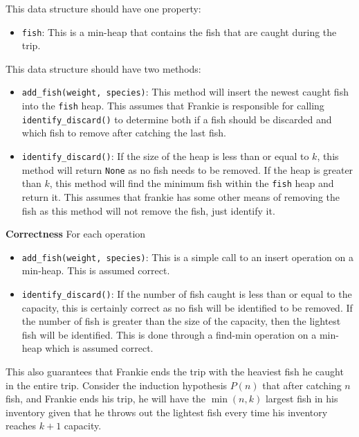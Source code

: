 \documentclass[12pt,twoside]{article}
\begin{document}
\begin{problems}
\begin{problemparts}
 This data structure should have one property:
    \begin{itemize}
        \item {\tt fish}: This is a min-heap that contains the fish that are
        caught during the trip.
    \end{itemize}
    This data structure should have two methods:
    \begin{itemize}
        \item {\tt add\_fish(weight, species)}: This method will insert the
        newest caught fish into the {\tt fish} heap. This assumes that
        Frankie is responsible for calling {\tt identify\_discard()} to
        determine both if a fish should be discarded and which fish to remove
        after catching the last fish.
        \item {\tt identify\_discard()}: If the size of the heap is less than
        or equal to $ k $, this method will return {\tt None} as no fish
        needs to be removed. If the heap is greater than $ k $, this method
        will find the minimum fish within the {\tt fish} heap and return it.
        This assumes that frankie has some other means of removing the fish as
        this method will not remove the fish, just identify it.
    \end{itemize}

    \smallbreak

    {\bf Correctness} For each operation
    \begin{itemize}
        \item {\tt add\_fish(weight, species)}: This is a simple call to an
        insert operation on a min-heap. This is assumed correct.
        \item {\tt identify\_discard()}: If the number of fish caught is less
        than or equal to the capacity, this is certainly correct as no fish
        will be identified to be removed. If the number of fish is greater
        than the size of the capacity, then the lightest fish will be
        identified. This is done through a find-min operation on a min-heap
        which is assumed correct.
    \end{itemize}

    This also guarantees that Frankie ends the trip with the heaviest fish
    he caught in the entire trip. Consider the induction hypothesis $ P(n) $
    that after catching $ n $ fish, and Frankie ends his trip, he will have
    the $ \min(n, k) $ largest fish in his inventory given that he throws out
    the lightest fish every time his inventory reaches $ k + 1 $ capacity.


\end{problemparts}
\end{problems}
\end{document}
